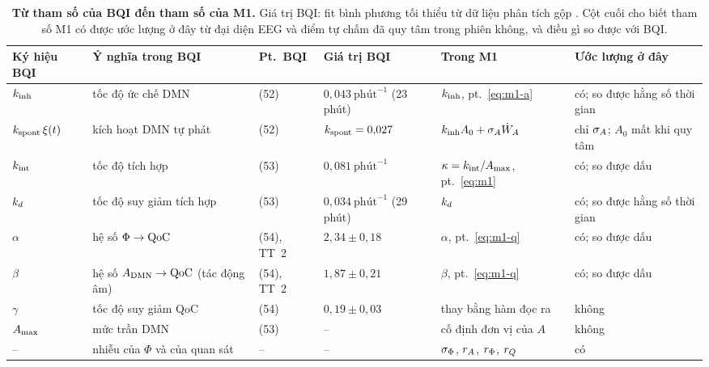 \begin{table}[t]
\caption{\textbf{Từ tham số của BQI đến tham số của M1.} Giá trị BQI: fit bình phương tối thiểu từ dữ liệu phân tích gộp \cite[Bảng~5]{BQI}. Cột cuối cho biết tham số M1 có được ước lượng ở đây từ đại diện EEG và điểm tự chấm đã quy tâm trong phiên không, và điều gì so được với BQI.}
\label{tab:bqimap}
\centering\footnotesize
\setlength{\tabcolsep}{3pt}
\begin{tabular}{llllll}
\toprule
Ký hiệu BQI & Ý nghĩa trong BQI & Pt.\ BQI & Giá trị BQI & Trong M1 & Ước lượng ở đây \\
\midrule
$k_{\mathrm{inh}}$ & tốc độ ức chế DMN & (52) & $0{,}043~\text{phút}^{-1}$ (23 phút) & $k_{\mathrm{inh}}$, pt.~\eqref{eq:m1-a} & có; so được hằng số thời gian \\
$k_{\mathrm{spont}}\,\xi(t)$ & kích hoạt DMN tự phát & (52) & $k_{\mathrm{spont}}=0{,}027$ & $k_{\mathrm{inh}} A_0+\sigma_{A}\dot W_A$ & chỉ $\sigma_{A}$; $A_0$ mất khi quy tâm \\
$k_{\mathrm{int}}$ & tốc độ tích hợp & (53) & $0{,}081~\text{phút}^{-1}$ & $\kappa=k_{\mathrm{int}}/A_{\max}$, pt.~\eqref{eq:m1} & có; so được dấu \\
$k_{d}$ & tốc độ suy giảm tích hợp & (53) & $0{,}034~\text{phút}^{-1}$ (29 phút) & $k_{d}$ & có; so được hằng số thời gian \\
$\alpha$ & hệ số $\Phi\to\mathrm{QoC}$ & (54), TT~2 & $2{,}34\pm0{,}18$ & $\alpha$, pt.~\eqref{eq:m1-q} & có; so được dấu \\
$\beta$ & hệ số $A_{\mathrm{DMN}}\to\mathrm{QoC}$ (tác động âm) & (54), TT~2 & $1{,}87\pm0{,}21$ & $\beta$, pt.~\eqref{eq:m1-q} & có; so được dấu \\
$\gamma$ & tốc độ suy giảm QoC & (54) & $0{,}19\pm0{,}03$ & thay bằng hàm đọc ra & không \\
$A_{\max}$ & mức trần DMN & (53) & -- & cố định đơn vị của $A$ & không \\
-- & nhiễu của $\Phi$ và của quan sát & -- & -- & $\sigma_{\Phi}$, $r_{A}$, $r_{\Phi}$, $r_{Q}$ & có \\
\bottomrule
\end{tabular}
\end{table}

